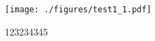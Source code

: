 
\begin{figure}[ht]
\centering
\texttt{[image: ./figures/test1\_1.pdf]}
\caption{123234345} \label{test1_fig1}
\end{figure}


